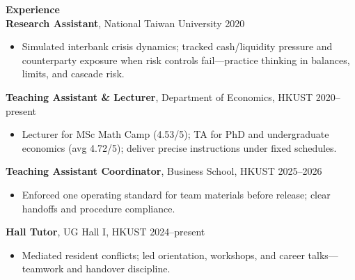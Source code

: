 \documentclass[11pt,letterpaper]{article}
\begin{document}
{\large \textbf{Experience}}\\[-0.5pt]
\textbf{Research Assistant}, National Taiwan University \hfill 2020\\
\vspace{-6pt}
\begin{itemize}
  \item Simulated interbank crisis dynamics; tracked cash/liquidity pressure and counterparty exposure when risk controls fail---practice thinking in balances, limits, and cascade risk.
\end{itemize}
\textbf{Teaching Assistant \& Lecturer}, Department of Economics, HKUST \hfill 2020--present\\
\vspace{-6pt}
\begin{itemize}
  \item Lecturer for MSc Math Camp (4.53/5); TA for PhD and undergraduate economics (avg 4.72/5); deliver precise instructions under fixed schedules.
\end{itemize}
\textbf{Teaching Assistant Coordinator}, Business School, HKUST \hfill 2025--2026\\
\vspace{-6pt}
\begin{itemize}
  \item Enforced one operating standard for team materials before release; clear handoffs and procedure compliance.
\end{itemize}
\textbf{Hall Tutor}, UG Hall I, HKUST \hfill 2024--present\\
\vspace{-6pt}
\begin{itemize}
  \item Mediated resident conflicts; led orientation, workshops, and career talks---teamwork and handover discipline.
\end{itemize}

\vspace{0.15pt}
\end{document}
